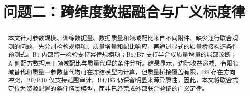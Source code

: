 \documentclass[bwprint]{template/gmcmthesis}
\title{问题二：跨维度数据融合与广义标度律}
\begin{document}
\maketitle

\begin{abstract}
本文针对参数规模、训练数据量、数据质量和领域配比来自不同附件、缺少逐行联合观测的问题，先分别检验规模项、质量增量和配比响应，再通过显式的质量桥接构造条件预测式。B1 内部留一检验支持幂律规模项；B6/B7 支持半合成质量增量的局部诊断；A 侧配方数据用于领域配比与质量代理的条件分析。结果显示，边际收益递减、有限领域替代和质量—参数替代均可在冻结模型内计算，但质量桥接覆盖有限，B8 存在方向冲突，B9/B10 仅支持范围审计，B4/B5 仍保留明显来源异质性。因此，本文将联合式定位为资源配置的条件情景模型，而非已经完成外部联合验证的广义定律。
\end{abstract}

\pagestyle{plain}

\end{document}
